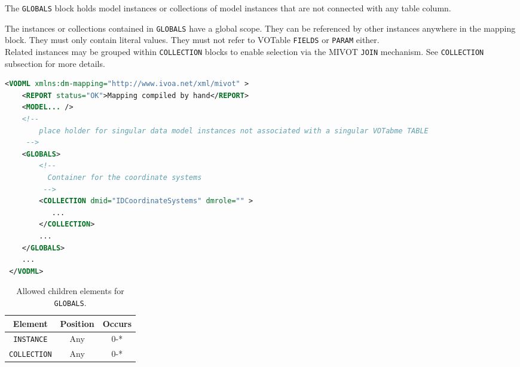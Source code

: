 The \texttt{GLOBALS} block holds model instances or collections of model instances 
that are not connected with any table column. 

The instances or collections contained in \texttt{GLOBALS} have a global scope. They can be
referenced by other instances anywhere in the mapping block.  
They must only contain literal values.
They must not refer to VOTable \texttt{FIELDS} or \texttt{PARAM} either.  \\ 

Related instances may be grouped within \texttt{COLLECTION} blocks to enable selection
via the MIVOT \texttt{JOIN} mechanism.  
See \texttt{COLLECTION} subsection for more details.

\begin{lstlisting}[caption={Example \texttt{GLOBALS} block (see line~\ref{GLOBALS_snippet} in Appendix~\ref{appendix_A} ) which contains a collection of coordinate systems.},language=XML]
<VODML xmlns:dm-mapping="http://www.ivoa.net/xml/mivot" >
    <REPORT status="OK">Mapping compiled by hand</REPORT>
    <MODEL... />
    <!--	             
        place holder for singular data model instances not associated with a singular VOTabme TABLE
     -->
    <GLOBALS>
        <!--
          Container for the coordinate systems
         -->
        <COLLECTION dmid="IDCoordinateSystems" dmrole="" >
           ...
        </COLLECTION>
        ...
    </GLOBALS>
    ...
 </VODML>
\end{lstlisting}


\begin{table}[!htbp]
  \small
  \centering
  \begin{tabulary}{\linewidth}{|c |c |c|}
    \hline 
        \textbf{Element} &
        \textbf{Position} &
        \textbf{Occurs}\\
    \hline
    \hline
        \texttt{INSTANCE} &
        Any &
        0-*\\
    \hline
        \texttt{COLLECTION} &
        Any &
        0-*\\
    \hline
  \end{tabulary}
  \caption{Allowed children elements for \texttt{GLOBALS}.} 
  \label{tbl:globals-children}
 \end{table}
